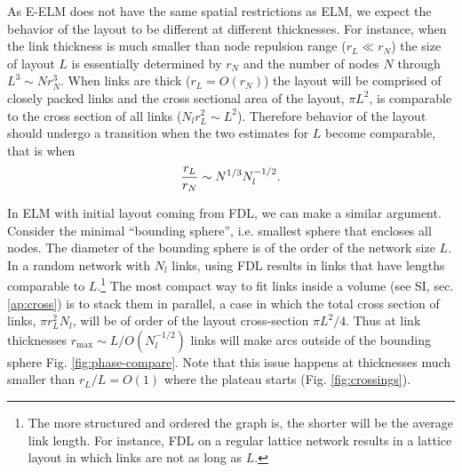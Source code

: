 \documentclass[nofootinbib,preprint,floatfix,endfloats]{revtex4} %
\begin{document}
As E-ELM does not have the same spatial restrictions as ELM, we expect the behavior of the layout to be different at different thicknesses. 
For instance, when the link thickness is much smaller than node repulsion range ($r_L\ll r_N$) the size of layout $L$ is essentially determined by $r_N$ and the number of nodes $N$ through
$ L^3 \sim Nr_N^3 $. %
When links are thick ($r_L = O(r_N)$) %
the layout will be comprised of closely packed links and the cross sectional area of the layout, $\pi L^2$, is comparable to the cross section of all links ($ N_l r_L^2 \sim L^2$). %
Therefore behavior of the layout should undergo a transition when the two estimates for $L$ become comparable, that is when 
\begin{equation}
    {r_L\over r_N} \sim N^{1/3} N_l^{-1/2}. \label{eq:trans}
\end{equation}

In ELM with initial layout coming from FDL, we can make a similar argument. Consider the minimal ``bounding sphere'', i.e. smallest sphere that encloses all nodes. 
The diameter of the bounding sphere is of the order of the network size $L$. 
In a random network with $N_l$ links, using FDL results in links that have lengths comparable to $L$.\footnote{The more structured and ordered the graph is, the shorter will be the average link length. 
For instance, FDL on a regular lattice network results in a lattice layout in which links are not as long as $L$.} 
The most compact way to fit links inside a volume (see SI, sec. \ref{ap:cross}) is to stack them in parallel, a case in which the total cross section of links, $\pi r_L^2 N_l$, will be of order of the layout cross-section $\pi L^2/4$. 
Thus at link thicknesses $r_\mathrm{max} \sim L/O(N_l^{-1/2})$ links will make arcs outside of the bounding sphere %
Fig. \ref{fig:phase-compare}. Note that this issue happens at thicknesses much smaller than $r_L/L = O(1)$ where the plateau starts (Fig. \ref{fig:crossings}).  
\end{document}
